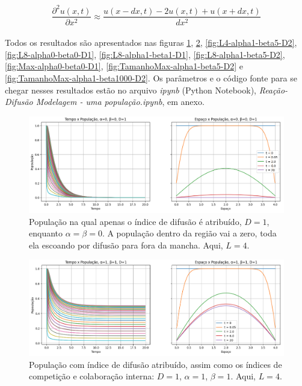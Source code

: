 \documentclass{article}
\begin{document}
	 $$ \frac{\partial^2 u(x,t)}{\partial x^2} \approx \frac{u(x-dx,t) - 2u(x,t) + u(x+dx,t)}{dx^2}$$
	 
	 \paragraph{}
	 Todos os resultados são apresentados nas figuras \ref{fig:L4-alpha0-beta0-D1}, \ref{fig:L4-alpha1-beta1-D1}, \ref{fig:L4-alpha1-beta5-D2}, \ref{fig:L8-alpha0-beta0-D1}, \ref{fig:L8-alpha1-beta1-D1}, \ref{fig:L8-alpha1-beta5-D2}, \ref{fig:Max-alpha0-beta0-D1}, \ref{fig:TamanhoMax-alpha1-beta5-D2} e \ref{fig:TamanhoMax-alpha1-beta1000-D2}. Os parâmetros e o código fonte para se chegar nesses resultados estão no arquivo \textit{ipynb} (Python Notebook), \textit{Reação-Difusão Modelagem - uma população.ipynb}, em anexo.
	 
	 \begin{figure}[h]
	 	\centering
	 	\includegraphics[scale=0.35]{L4-alpha0-beta0-D1}
	 	\caption{População na qual apenas o índice de difusão é atribuído, $D=1$, enquanto $\alpha = \beta = 0$. A população dentro da região vai a zero, toda ela escoando por difusão para fora da mancha. Aqui, $L=4$.}
	 	\label{fig:L4-alpha0-beta0-D1}
	 \end{figure}
 
 	\begin{figure}[h]
 		\centering
 		\includegraphics[scale=0.35]{L4-alpha1-beta1-D1}
 		\caption{População com índice de difusão atribuído, assim como os índices de competição e colaboração interna: $D=1$, $\alpha=1$, $\beta=1$. Aqui, $L=4$.}
 		\label{fig:L4-alpha1-beta1-D1}
 	\end{figure}
 	
\end{document}

